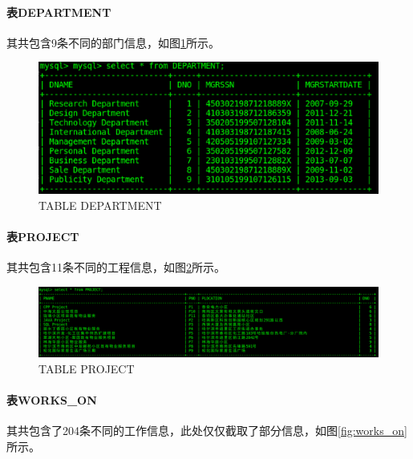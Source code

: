 \documentclass{ML}
\begin{document}
\paragraph{表DEPARTMENT} 其共包含9条不同的部门信息，如图\ref{fig:department}所示。
\begin{figure}[htb]
    \centering
    \includegraphics[scale = 0.5, bb = 0 0 789 307]{media/department.eps}
    \caption{TABLE DEPARTMENT}\label{fig:department}
\end{figure}
\paragraph{表PROJECT} 其共包含11条不同的工程信息，如图\ref{fig:project}所示。
\begin{figure}[htb]
    \centering
    \includegraphics[scale = 0.25, bb = 0 0 1698 356]{media/project.eps}
    \caption{TABLE PROJECT}\label{fig:project}
\end{figure}
\paragraph{表WORKS\_ON} 其共包含了204条不同的工作信息，此处仅仅截取了部分信息，如图\ref{fig:works_on}所示。
\end{document}
